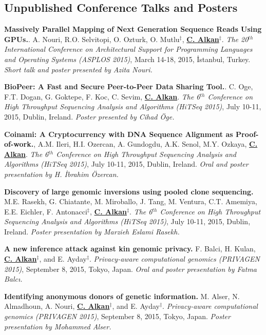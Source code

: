 \documentclass[margin,line]{res}
\begin{document}
\begin{resume}
\vspace{-.4cm}
\subsection{\small \sc  Unpublished Conference Talks and Posters}
\vspace{-.2cm}
 {\bf Massively Parallel Mapping of Next Generation Sequence Reads Using GPUs.}.
  A. Nouri, R.O. Selvitopi, O. Ozturk, O. Mutlu$^\ddag$, {\bf {\underline{C. Alkan}}}$^\ddag$.
{\em The 20$^{th}$ International Conference on Architectural Support for Programming Languages and Operating Systems (ASPLOS 2015)}, 
March 14-18, 2015, İstanbul, Turkey. {\it Short talk and poster presented by Azita Nouri.}

\vspace{-.2cm}
 {\bf BioPeer: A Fast and Secure Peer-to-Peer Data Sharing Tool.}.
  C. Oge, F.T. Dogan, G. Goktepe, F. Koc, C. Sevim, {\bf {\underline{C. Alkan}}}.
{\em The 6$^{th}$ Conference on High Throughput Sequencing Analysis and Algorithms (HiTSeq 2015)}, 
July 10-11, 2015, Dublin, Ireland. {\it Poster presented by Cihad Öge.}

\vspace{-.2cm}
 {\bf Coinami: A Cryptocurrency with DNA Sequence Alignment as Proof-of-work.},
  A.M. Ileri, H.I. Ozercan, A. Gundogdu, A.K. Senol, M.Y. Ozkaya, {\bf {\underline{C. Alkan}}}.
{\em The 6$^{th}$ Conference on High Throughput Sequencing Analysis and Algorithms (HiTSeq 2015)}, 
July 10-11, 2015, Dublin, Ireland. {\it Oral and poster presentation by H. İbrahim Özercan.}

\vspace{-.2cm}
{\bf Discovery of large genomic inversions using pooled clone sequencing.}
M.E. Rasekh, G. Chiatante, M. Miroballo, J. Tang, M. Ventura, C.T. Amemiya, E.E. Eichler, F. Antonacci$^\ddag$, {\bf {\underline{C. Alkan}}}$^\ddag$.
{\em The 6$^{th}$ Conference on High Throughput Sequencing Analysis and Algorithms (HiTSeq 2015)}, 
July 10-11, 2015, Dublin, Ireland. {\it Poster presentation by Marzieh Eslami Rasekh.}

\vspace{-.2cm}
{\bf  A new inference attack against kin genomic privacy.}
F. Balci, H. Kulan, {\bf {\underline{C. Alkan}}}$^\ddag$, and E. Ayday$^\ddag$. 
{\em Privacy-aware computational genomics (PRIVAGEN 2015)}, 
 September 8, 2015, Tokyo, Japan. {\it Oral and poster presentation by Fatma Balcı.}

\vspace{-.2cm}
{\bf Identifying anonymous donors of genetic information.}
M. Alser, N. Almadhoun, A. Nouri, {\bf {\underline{C. Alkan}}}$^\ddag$, and E. Ayday$^\ddag$. 
{\em Privacy-aware computational genomics (PRIVAGEN 2015)}, 
 September 8, 2015, Tokyo, Japan. {\it Poster presentation by Mohammed Alser.}



\end{resume}
\end{document}
